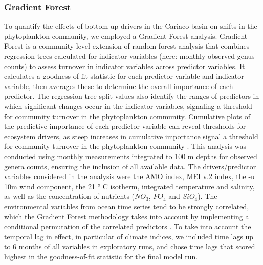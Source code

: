 \documentclass[draft]{agujournal2019}
\begin{document}
    \subsubsection{Gradient Forest}
    To quantify the effects of bottom-up drivers in the Cariaco basin on shifts in the phytoplankton community, we employed a Gradient Forest analysis. Gradient Forest is a community-level extension of random forest analysis that combines regression trees calculated for indicator variables (here: monthly observed genus counts) to assess turnover in indicator variables across predictor variables\cite{pitcher_example_2012, large_critical_2015, tam_comparing_2017}. It calculates a goodness-of-fit statistic for each predictor variable and indicator variable, then averages these to determine the overall importance of each predictor. The regression tree split values also identify the ranges of predictors in which significant changes occur in the indicator variables, signaling a threshold for community turnover in the phytoplankton community. Cumulative plots of the predictive importance of each predictor variable can reveal thresholds for ecosystem drivers, as steep increases in cumulative importance signal a threshold for community turnover in the phytoplankton community \cite{tam_comparing_2017}. This analysis was conducted using monthly measurements integrated to 100 m depths for observed genera counts, ensuring the inclusion of all available data. The drivers/predictor variables considered in the analysis were the AMO index, MEI v.2 index, the -u 10m wind component, the 21 ° C isotherm, integrated temperature and salinity, as well as the concentration of nutrients ($NO_3$, $PO_4$ and $SiO_4$). The environmental variables from ocean time series tend to be strongly correlated, which the Gradient Forest methodology takes into account by implementing a conditional permutation of the correlated predictors \cite{ellis_gradient_2012}. To take into account the temporal lag in effect, in particular of climate indices, we included time lags up to 6 months of all variables in exploratory runs, and chose time lags that scored highest in the goodness-of-fit statistic for the final model run. %
    
\end{document}
